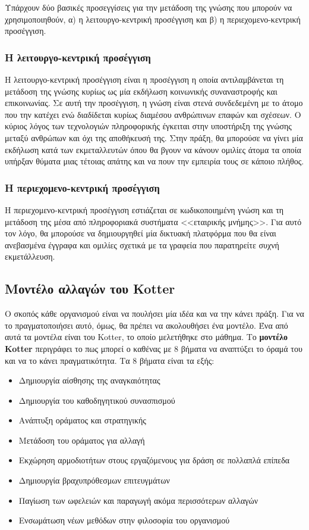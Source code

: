 Υπάρχουν δύο βασικές προσεγγίσεις για την μετάδοση της γνώσης που μπορούν να χρησιμοποιηθούν, α) η λειτουργο-κεντρική προσέγγιση και β) η περιεχομενο-κεντρική προσέγγιση.

\subsubsection*{Η λειτουργο-κεντρική προσέγγιση}

Η λειτουργο-κεντρική προσέγγιση είναι η προσέγγιση η οποία αντιλαμβάνεται τη μετάδοση της γνώσης κυρίως ως μία εκδήλωση κοινωνικής συναναστροφής και επικοινωνίας. Σε αυτή την προσέγγιση, η γνώση είναι στενά συνδεδεμένη με το άτομο που την κατέχει ενώ διαδίδεται κυρίως διαμέσου ανθρώπινων επαφών και σχέσεων. Ο κύριος λόγος των τεχνολογιών πληροφορικής έγκειται στην υποστήριξη της γνώσης μεταξύ ανθρώπων και όχι της αποθήκευσή της. Στην πράξη, θα μπορούσε να γίνει μία εκδήλωση κατά των εκμεταλλευτών όπου θα βγουν να κάνουν ομιλίες άτομα τα οποία υπήρξαν θύματα μιας τέτοιας απάτης και να πουν την εμπειρία τους σε κάποιο πλήθος.

\subsubsection*{Η περιεχομενο-κεντρική προσέγγιση}

Η περιεχομενο-κεντρική προσέγγιση εστιάζεται σε κωδικοποιημένη γνώση και τη μετάδοση της μέσα από πληροφοριακά συστήματα <<εταιρικής μνήμης>>. Για αυτό τον λόγο, θα μπορούσε να δημιουργηθεί μία δικτυακή πλατφόρμα που θα είναι ανεβασμένα έγγραφα και ομιλίες σχετικά με τα γραφεία που παρατηρείτε συχνή εκμετάλλευση.

\subsection{Μοντέλο αλλαγών του Kotter}

Ο σκοπός κάθε οργανισμού είναι να πουλήσει μία ιδέα και να την κάνει πράξη. Για να το πραγματοποιήσει αυτό, όμως, θα πρέπει να ακολουθήσει ένα μοντέλο. Ένα από αυτά τα μοντέλα είναι του Kotter, το οποίο μελετήθηκε στο μάθημα. Το \textbf{μοντέλο Kotter} περιγράφει το πως μπορεί ο καθένας με 8 βήματα να αναπτύξει το όραμά του και να το κάνει πραγματικότητα. Τα 8 βήματα είναι τα εξής:

\begin{itemize}
  \item Δημιουργία αίσθησης της αναγκαιότητας
  \item Δημιουργία του καθοδηγητικού συνασπισμού
  \item Ανάπτυξη οράματος και στρατηγικής
  \item Μετάδοση του οράματος για αλλαγή
  \item Εκχώρηση αρμοδιοτήτων στους εργαζόμενους για δράση σε πολλαπλά επίπεδα
  \item Δημιουργία βραχυπρόθεσμων επιτευγμάτων
  \item Παγίωση των ωφελειών και παραγωγή ακόμα περισσότερων αλλαγών
  \item Ενσωμάτωση νέων μεθόδων στην φιλοσοφία του οργανισμού
\end{itemize}

